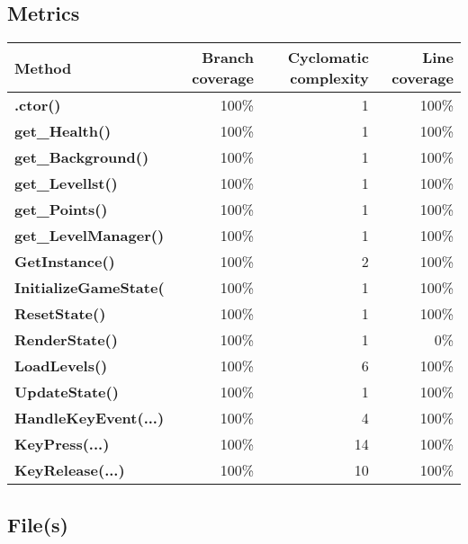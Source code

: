 \documentclass[a4paper,landscape,10pt]{article}
\begin{document}
\subsection{Metrics}
\begin{longtable}[l]{|l|r|r|r|}
\hline
\textbf{Method} & \textbf{Branch coverage} & \textbf{Cyclomatic complexity} & \textbf{Line coverage}\\
\hline
\textbf{.ctor()} & 100\% & 1 & 100\%\\
\hline
\textbf{get\_Health()} & 100\% & 1 & 100\%\\
\hline
\textbf{get\_Background()} & 100\% & 1 & 100\%\\
\hline
\textbf{get\_Levellst()} & 100\% & 1 & 100\%\\
\hline
\textbf{get\_Points()} & 100\% & 1 & 100\%\\
\hline
\textbf{get\_LevelManager()} & 100\% & 1 & 100\%\\
\hline
\textbf{GetInstance()} & 100\% & 2 & 100\%\\
\hline
\textbf{InitializeGameState(} & 100\% & 1 & 100\%\\
\hline
\textbf{ResetState()} & 100\% & 1 & 100\%\\
\hline
\textbf{RenderState()} & 100\% & 1 & 0\%\\
\hline
\textbf{LoadLevels()} & 100\% & 6 & 100\%\\
\hline
\textbf{UpdateState()} & 100\% & 1 & 100\%\\
\hline
\textbf{HandleKeyEvent(...)} & 100\% & 4 & 100\%\\
\hline
\textbf{KeyPress(...)} & 100\% & 14 & 100\%\\
\hline
\textbf{KeyRelease(...)} & 100\% & 10 & 100\%\\
\hline
\end{longtable}
\subsection{File(s)}
\end{document}

